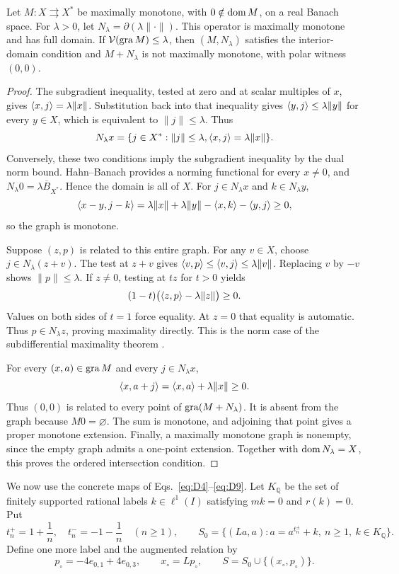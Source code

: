 \begin{lemma}\label{lem:norm-partner}
Let $M:X\rightrightarrows X^*$ be maximally monotone, with
$0\notin\operatorname{dom} M$, on a real Banach space. For $\lambda>0$, let
$N_\lambda=\partial(\lambda\|\cdot\|)$. This operator is maximally
monotone and has full domain. If $\mathcal V(\operatorname{gra} M)\le\lambda$, then
$(M,N_\lambda)$ satisfies the interior-domain condition and
$M+N_\lambda$ is not maximally monotone, with polar witness $(0,0)$.
\end{lemma}
\begin{proof}
The subgradient inequality, tested at zero and at scalar multiples of
$x$, gives $\langle x,j\rangle=\lambda\|x\|$. Substitution back into that
inequality gives $\langle y,j\rangle\le\lambda\|y\|$ for every $y\in X$,
which is equivalent to $\|j\|\le\lambda$. Thus
\[
N_\lambda x=\{j\in X^*: \|j\|\le\lambda,
                  \langle x,j\rangle=\lambda\|x\|\}.
\]
Conversely, these two conditions imply the subgradient inequality by the
dual norm bound. Hahn--Banach provides a norming functional for every
$x\ne0$, and $N_\lambda0=\lambda\overline B_{X^*}$. Hence the domain is
all of $X$. For $j\in N_\lambda x$ and $k\in N_\lambda y$,
\[
\langle x-y,j-k\rangle
=\lambda\|x\|+\lambda\|y\|-\langle x,k\rangle-\langle y,j\rangle\ge0,
\]
so the graph is monotone.

Suppose $(z,p)$ is related to this entire graph. For any $v\in X$,
choose $j\in N_\lambda(z+v)$. The test at $z+v$ gives
$\langle v,p\rangle\le\langle v,j\rangle\le\lambda\|v\|$. Replacing $v$ by $-v$
shows $\|p\|\le\lambda$. If $z\ne0$, testing at $tz$ for $t>0$ yields
\[
(1-t)\bigl(\langle z,p\rangle-\lambda\|z\|\bigr)\ge0.
\]
Values on both sides of $t=1$ force equality. At $z=0$ that equality is
automatic. Thus $p\in N_\lambda z$, proving maximality directly.
This is the norm case of the subdifferential maximality theorem
\cite{rockafellar1970subdiff}.

For every $(x,a)\in\operatorname{gra} M$ and every $j\in N_\lambda x$,
\[
\langle x,a+j\rangle=\langle x,a\rangle+\lambda\|x\|\ge0.
\]
Thus $(0,0)$ is related to every point of $\operatorname{gra}(M+N_\lambda)$. It is absent from the graph
because $M0=\varnothing$. The sum is monotone, and adjoining that point
gives a proper monotone extension. Finally, a maximally monotone graph is
nonempty, since the empty graph admits a one-point extension. Together
with $\operatorname{dom} N_\lambda=X$, this proves the ordered intersection condition.
\end{proof}

We now use the concrete maps of Eqs.~\eqref{eq:D4}--\eqref{eq:D9}.
Let $K_{\mathbb Q}$ be the set of finitely supported rational labels
$k\in\ell^1(I)$ satisfying $mk=0$ and $r(k)=0$. Put
\[
t_n^+=1+\frac{1}{n},\quad t_n^-=-1-\frac{1}{n}\quad(n\ge1),\qquad
S_0=\{(La,a):a=a^{t_n^\pm}+k,\ n\ge1,\ k\in K_{\mathbb Q}\}.
\]
Define one more label and the augmented relation by
\begin{equation}
p_\circ=-4e_{0,1}+4e_{0,3},\qquad x_\circ=Lp_\circ,
\qquad S=S_0\cup\{(x_\circ,p_\circ)\}.
\label{eq:nonconstructive-seed}
\end{equation}

